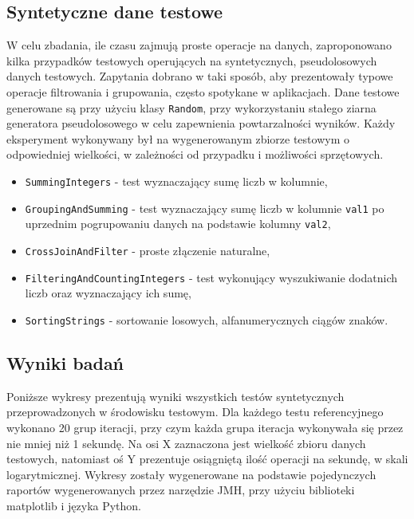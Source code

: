 \documentclass[12pt,twoside,openright]{extarticle}
\begin{document}
\subsection{Syntetyczne dane testowe}

    W celu zbadania, ile czasu zajmują proste operacje na danych, zaproponowano kilka przypadków testowych operujących na syntetycznych, pseudolosowych danych testowych. Zapytania dobrano w taki sposób, aby prezentowały typowe operacje filtrowania i grupowania, często spotykane w aplikacjach. Dane testowe generowane są przy użyciu klasy \texttt{Random}, przy wykorzystaniu stałego ziarna generatora pseudolosowego w celu zapewnienia powtarzalności wyników. Każdy eksperyment wykonywany był na wygenerowanym zbiorze testowym o odpowiedniej wielkości, w zależności od przypadku i możliwości sprzętowych.

\begin{itemize}
    \item \texttt{SummingIntegers} - test wyznaczający sumę liczb w kolumnie,
    \item \texttt{GroupingAndSumming} - test wyznaczający sumę liczb w kolumnie \texttt{val1} po uprzednim pogrupowaniu danych na podstawie kolumny \texttt{val2},
    \item \texttt{CrossJoinAndFilter} - proste złączenie naturalne,
    \item \texttt{FilteringAndCountingIntegers} - test wykonujący wyszukiwanie dodatnich liczb oraz wyznaczający ich sumę,
    \item \texttt{SortingStrings} - sortowanie losowych, alfanumerycznych ciągów znaków.
\end{itemize}

\newpage

\subsection{Wyniki badań}

    Poniższe wykresy prezentują wyniki wszystkich testów syntetycznych przeprowadzonych w środowisku testowym. Dla każdego testu referencyjnego wykonano 20 grup iteracji, przy czym każda grupa iteracja wykonywała się przez nie mniej niż 1 sekundę. Na osi X zaznaczona jest wielkość zbioru danych testowych, natomiast oś Y prezentuje osiągniętą ilość operacji na sekundę, w skali logarytmicznej. Wykresy zostały wygenerowane na podstawie pojedynczych raportów wygenerowanych przez narzędzie JMH, przy użyciu biblioteki matplotlib \cite{matplotlib} i języka Python.
\end{document}
